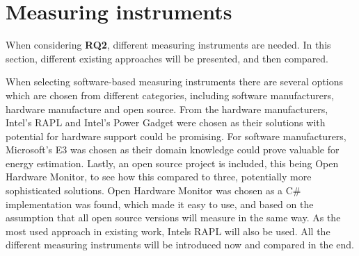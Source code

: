 \section{Measuring instruments}\label{sec:measuring_instruments}

When considering \textbf{RQ2}, different measuring instruments are needed. In this section, different existing approaches will be presented, and then compared.

When selecting software-based measuring instruments there are several options which are chosen from different categories, including software manufacturers, hardware manufacture and open source. From the hardware manufacturers, Intel's RAPL and Intel's Power Gadget were chosen as their solutions with potential for hardware support could be promising. For software manufacturers, Microsoft's E3 was chosen as their domain knowledge could prove valuable for energy estimation. Lastly, an open source project is included, this being Open Hardware Monitor, to see how this compared to three, potentially more sophisticated solutions. Open Hardware Monitor was chosen as a C\# implementation was found, which made it easy to use, and based on the assumption that all open source versions will measure in the same way. As the most used approach in existing work, Intels RAPL will also be used. All the different measuring instruments will be introduced now and compared in the end.






